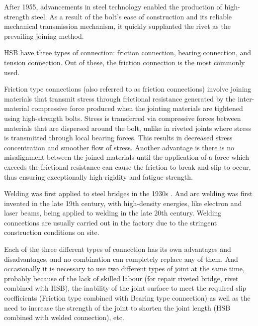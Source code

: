 After 1955, advancements in steel technology enabled the production of high-strength steel. As a result of the bolt's ease of construction and its reliable mechanical transmission mechanism, it quickly supplanted the rivet as the prevailing joining method.

\ac{HSB} have three types of connection: friction connection, bearing connection, and tension connection. Out of these, the friction connection is the most commonly used.

Friction type connections (also referred to as friction connections) involve joining materials that transmit stress through frictional resistance generated by the inter-material compressive force produced when the jointing materials are tightened using high-strength bolts. Stress is transferred via compressive forces between materials that are dispersed around the bolt, unlike in riveted joints where stress is transmitted through local bearing forces. This results in decreased stress concentration and smoother flow of stress. Another advantage is there is no misalignment between the joined materials until the application of a force which exceeds the frictional resistance can cause the friction to break and slip to occur, thus ensuring exceptionally high rigidity and fatigue strength.

Welding was first applied to steel bridges in the 1930s \cite{ALENCAR2019154}. And arc welding was first invented in the late 19th century, with high-density energies, like electron and laser beams, being applied to welding in the late 20th century. Welding conncetions are usually carried out in the factory due to the stringent construction conditions on site.


Each of the three different types of connection has its own advantages and disadvantages, and no combination can completely replace any of them. And occasionally it is necessary to use two different types of joint at the same time, probably because of the lack of skilled labour (for repair riveted bridge, rivet combined with HSB), the inability of the joint surface to meet the required slip coefficients (Friction type combined with Bearing type connection) as well as the need to increase the strength of the joint to shorten the joint length (HSB combined with welded connection), etc.



